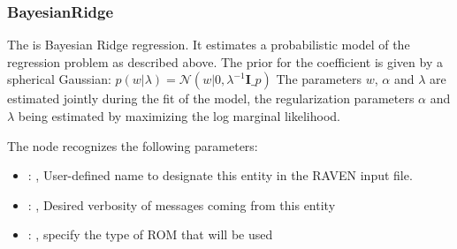 \subsubsection{BayesianRidge}
  The  is Bayesian Ridge regression.                         It estimates a
  probabilistic model of the regression problem as                         described above. The
  prior for the coefficient is given by a                         spherical Gaussian:
  $p(w|\lambda) = \mathcal{N}(w|0,\lambda^{-1}\mathbf{I}\_{p})$                         The
  parameters $w$, $\alpha$ and $\lambda$ are estimated jointly during                         the
  fit of the model, the regularization parameters $\alpha$ and $\lambda$
  being estimated by maximizing the log marginal likelihood.

  The  node recognizes the following parameters:
    \begin{itemize}
      \item {}: , 
        User-defined name to designate this entity in the RAVEN input file.
      \item {}: , 
        Desired verbosity of messages coming from this entity
      \item {}: , 
        specify the type of ROM that will be used
  \end{itemize}


